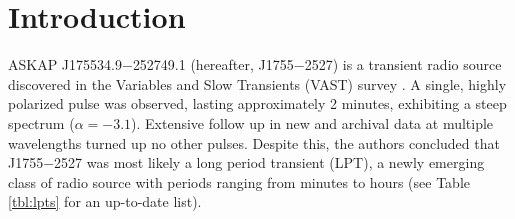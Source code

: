\documentclass[preprint2,linenumbers]{aastex631}
\newcommand{\src}{J1755$-$2527}
\newcommand{\srcfull}{ASKAP J175534.9$-$252749.1}
\begin{document}
\begin{abstract}

[Abstract goes here\dots]

\end{abstract}



\section{Introduction} \label{sec:introduction}

\srcfull{} (hereafter, \src{}) is a transient radio source discovered in the Variables and Slow Transients (VAST) survey \citep[][hereafter ]{2024MNRAS.535..909D}.
A single, highly polarized pulse was observed, lasting approximately 2 minutes, exhibiting a steep spectrum ($\alpha = -3.1$).
Extensive follow up in new and archival data at multiple wavelengths turned up no other pulses.
Despite this, the authors concluded that \src{} was most likely a long period transient (LPT), a newly emerging class of radio source with periods ranging from minutes to hours (see Table \ref{tbl:lpts} for an up-to-date list).
\end{document}
